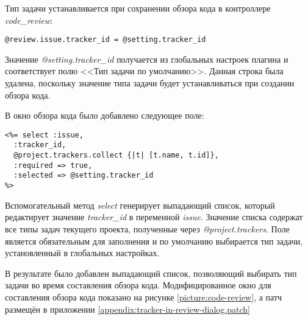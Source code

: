 Тип задачи устанавливается при сохранении обзора кода в контроллере
\textit{code\_review}:
\small{\begin{lstlisting}
@review.issue.tracker_id = @setting.tracker_id
\end{lstlisting}}
Значение \textit{@setting.tracker\_id} получается из глобальных настроек
плагина и соответствует полю <<Тип задачи по умолчанию>>. Данная строка была
удалена, поскольку значение типа задачи будет устанавливаться при создании
обзора кода.

В окно обзора кода было добавлено следующее поле:
\small{\begin{lstlisting}
<%= select :issue,
  :tracker_id,
  @project.trackers.collect {|t| [t.name, t.id]},
  :required => true, 
  :selected => @setting.tracker_id 
%>
\end{lstlisting}}
Вспомогательный метод \textit{select} генерирует выпадающий список, который
редактирует значение \textit{tracker\_id} в переменной \textit{issue}. Значение
списка содержат все типы задач текущего проекта, полученные через
\textit{@project.trackers}. Поле является обязательным для заполнения и по
умолчанию выбирается тип задачи, установленный в глобальных настройках.

В результате было добавлен выпадающий список, позволяющий выбирать тип задачи
во время составления обзора кода. Модифицированное окно для составления обзора
кода показано на рисунке \ref{picture:code-review}, а патч размещён в
приложении \ref{appendix:tracker-in-review-dialog.patch}


